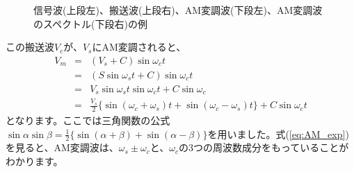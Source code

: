 \begin{figure}
\caption{信号波(上段左)、搬送波(上段右)、AM変調波(下段左)、AM変調波のスペクトル(下段右)の例}
\end{figure}

この搬送波$V_c$が、$V_s$にAM変調されると、
\begin{eqnarray}
V_m &=& (V_s + C)\sin\omega_ct \label{eq:AM}\\ 
&=&(S\sin\omega_s t + C)\sin\omega_c t \nonumber \\
&=& V_s\sin\omega_s t \sin\omega_c t + C\sin\omega_c \nonumber \\
&=& \frac{V_s}{2}\{\sin(\omega_c + \omega_s)t + \sin(\omega_c - \omega_s)t\} + C\sin\omega_ct \label{eq:AM_exp}
\end{eqnarray}
となります。ここでは三角関数の公式$\sin\alpha\sin\beta=\frac{1}{2}\{\sin(\alpha+\beta)+\sin(\alpha-\beta)\}$を用いました。式(\ref{eq:AM_exp})を見ると、AM変調波は、$\omega_s \pm \omega_c$と、$\omega_c$の3つの周波数成分をもっていることがわかります。

